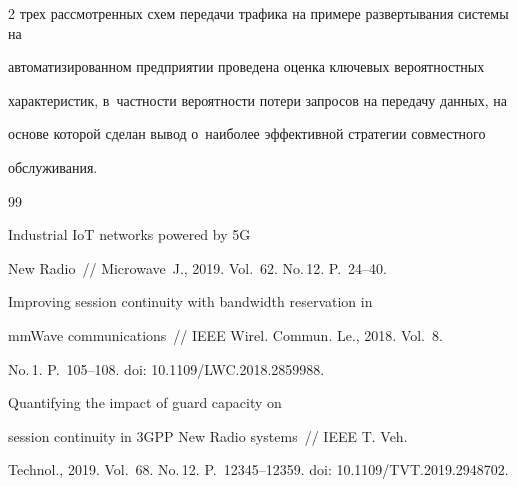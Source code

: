 \begin{multicols}{2}
трех рассмотренных схем передачи трафика на примере развертывания сис\-те\-мы на 


автоматизированном предприятии проведена оценка ключевых вероятностных 


характеристик, в~част\-ности вероятности потери запросов на передачу данных, на 


основе которой сделан вывод о~наиболее эффективной стратегии совместного 


обслуживания.





{\small\frenchspacing


 {\baselineskip=10.6pt




 \begin{thebibliography}{99}




 Industrial IoT networks powered by 5G 


New Radio~// Microwave~J., 2019. Vol.~62. No.\,12. P.~24--40.







 Improving session continuity with bandwidth reservation in 


mm{W}ave communications~// IEEE Wirel. Commun. Le., 2018. Vol.~8. 


No.\,1. P.~105--108. doi: 10.1109/LWC.2018.2859988.







 Quantifying the impact of guard capacity on 


session continuity in 3GPP New Radio systems~// IEEE T. Veh. 


Technol., 2019. Vol.~68. No.\,12. P.~12345--12359. doi: 10.1109/TVT.2019.2948702.










\end{thebibliography}}}
\end{multicols}
